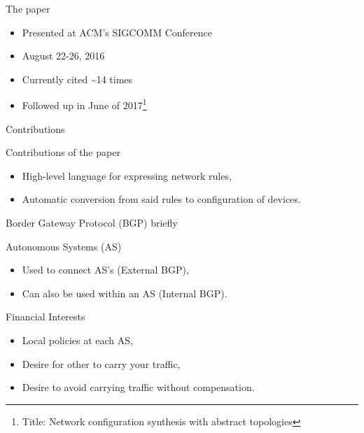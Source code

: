 \begin{frame}{The paper}
    \begin{block}{}
        \begin{itemize}
            \item Presented at ACM's SIGCOMM Conference
            \item August 22-26, 2016
            \item Currently cited \~{}14 times
            \item Followed up in June of 2017\footnote{Title: Network configuration synthesis with abstract topologies}
        \end{itemize}
    \end{block}
\end{frame}

\begin{frame}{Contributions}
    \begin{block}{Contributions of the paper}
        \begin{itemize}
            \item High-level language for expressing \textcolor{ReneOrange}{network rules},
            \item \textcolor{ReneOrange}{Automatic conversion} from said rules to configuration of devices.
        \end{itemize}
    \end{block}
\end{frame}

\begin{frame}{Border Gateway Protocol (BGP) briefly}
    \begin{block}{Autonomous Systems (AS)}
        \begin{itemize}
            \item Used to connect AS's (External BGP),
            \item Can also be used within an AS (Internal BGP).
        \end{itemize}
    \end{block}
    \begin{block}{Financial Interests}
        \begin{itemize}
            \item Local policies at each AS,
            \item Desire for other to carry your traffic,
            \item Desire to avoid carrying traffic without compensation.
        \end{itemize}
    \end{block}
\end{frame}

